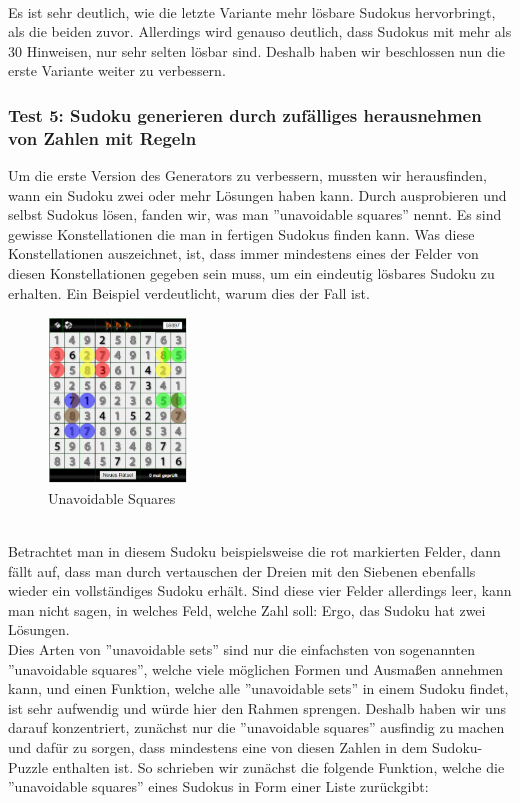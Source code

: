 \documentclass[11pt,a4paper]{article}
\begin{document}
\ \\
Es ist sehr deutlich, wie die letzte Variante mehr lösbare Sudokus hervorbringt, als die beiden zuvor. Allerdings wird genauso deutlich, dass Sudokus mit mehr als 30 Hinweisen, nur sehr selten lösbar sind. Deshalb haben wir beschlossen nun die erste Variante weiter zu verbessern. 
\newpage

\subsubsection{Test 5: Sudoku generieren durch zufälliges herausnehmen von Zahlen mit Regeln}
Um die erste Version des Generators zu verbessern, mussten wir herausfinden, wann ein Sudoku zwei oder mehr Lösungen haben kann. Durch ausprobieren und selbst Sudokus lösen, fanden wir, was man ''unavoidable squares'' nennt. Es sind gewisse Konstellationen die man in fertigen Sudokus finden kann. Was diese Konstellationen auszeichnet, ist, dass immer mindestens eines der Felder von diesen Konstellationen gegeben sein muss, um ein eindeutig lösbares Sudoku zu erhalten. Ein Beispiel verdeutlicht, warum dies der Fall ist. 
\ \\
\begin{figure}[htbp!]
\begin{center}
\includegraphics[width=0.33\textwidth]{UAS.pdf}
\end{center}
\caption{Unavoidable Squares}
\end{figure}
\ \\
Betrachtet man in diesem Sudoku beispielsweise die rot markierten Felder, dann fällt auf, dass man durch vertauschen der Dreien mit den Siebenen ebenfalls wieder ein vollständiges Sudoku erhält. Sind diese vier Felder allerdings leer, kann man nicht sagen, in welches Feld, welche Zahl soll: Ergo, das Sudoku hat zwei Lösungen.\\
Dies Arten von ''unavoidable sets'' sind nur die einfachsten von sogenannten ''unavoidable squares'', welche viele möglichen Formen und Ausmaßen annehmen kann,  und einen Funktion, welche alle ''unavoidable sets'' in einem Sudoku findet, ist sehr aufwendig und würde hier den Rahmen sprengen. Deshalb haben wir uns darauf konzentriert, zunächst nur die ''unavoidable squares'' ausfindig zu machen und dafür zu sorgen, dass mindestens eine von diesen Zahlen in dem Sudoku-Puzzle enthalten ist. So schrieben wir zunächst die folgende Funktion, welche die ''unavoidable squares'' eines Sudokus in Form einer Liste zurückgibt:
\end{document}
